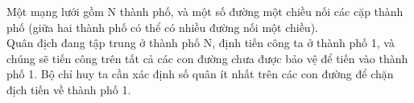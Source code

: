 Một mạng lưới gồm N thành phố, và một số đường một chiều nối các cặp thành phố (giữa hai thành phố có thể có nhiều đường nối một chiều).   
\\   Quân địch đang tập trung ở thành phố N, định tiến công ta ở thành phố 1, và chúng sẽ tiến công trên tất cả các con đường chưa được bảo vệ để tiến vào thành phố 1. Bộ chỉ huy ta cần xác định số quân ít nhất trên các con đường để chặn địch tiến về thành phố 1.